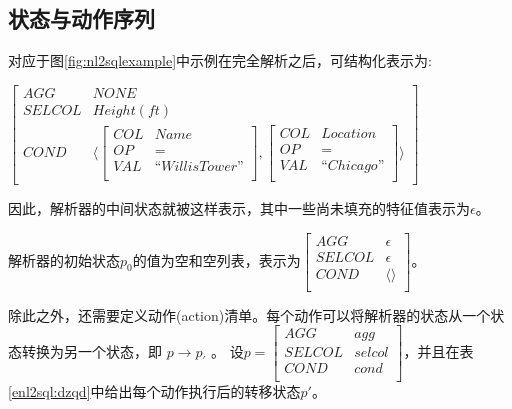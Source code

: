\subsection{状态与动作序列}
\label{enl2sql:dzxl}

对应于图\ref{fig:nl2sqlexample}中示例在完全解析之后，可结构化表示为:
  

$\begin{bmatrix}
  AGG    &  NONE  \\
  SELCOL &  Height(ft) \\
  COND   &   \langle
    \begin{bmatrix}
      COL  &  Name \\
      OP   &  =    \\
      VAL  &  “Willis Tower”\\
    \end{bmatrix}
    ,
    \begin{bmatrix}
      COL  &  Location \\
      OP   &  =    \\
      VAL  &  “Chicago”\\
    \end{bmatrix}
    \rangle
  \end{bmatrix}$

因此，解析器的中间状态就被这样表示，其中一些尚未填充的特征值表示为$\epsilon$。

解析器的初始状态$p_{0}$的值为空和空列表，表示为$\begin{bmatrix}
  AGG    &  \epsilon  \\
  SELCOL &  \epsilon \\
  COND   &   \langle \rangle\\
  \end{bmatrix}$。

除此之外，还需要定义动作(action)清单。每个动作可以将解析器的状态从一个状态转换为另一个状态，即 $p \rightarrow p_{'}$ 。
设$p = \begin{bmatrix}
  AGG    &  agg  \\
  SELCOL &  selcol \\
  COND   &   cond\\
  \end{bmatrix}$，并且在表\ref{enl2sql:dzqd}中给出每个动作执行后的转移状态$p'$。

